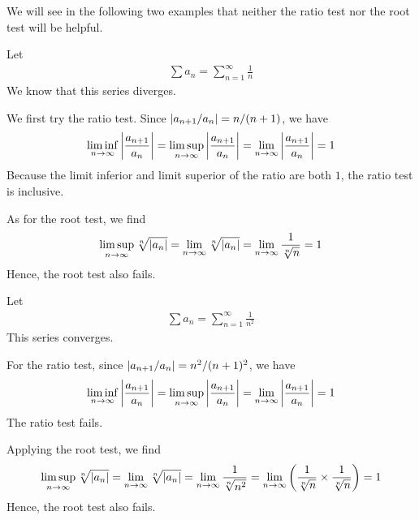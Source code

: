 \documentclass[thmcnt=section, 12pt]{my-elegantbook}
\begin{document}

We will see in the following two examples that neither the ratio test nor the root test will be helpful.

\begin{example}
    Let
    \begin{align*}
        \sum a_n = \sum_{n=1}^\infty \frac{1}{n}
    \end{align*}
    We know that this series diverges.

    We first try the ratio test. Since $\left\lvert  a_{n+1} / a_n  \right\rvert = n / (n+1)$, we have
    \begin{align*}
        \liminf_{n \to \infty} \left\lvert \frac{a_{n+1}}{a_n} \right\rvert
        = \limsup_{n \to \infty} \left\lvert \frac{a_{n+1}}{a_n} \right\rvert
        = \lim_{n \to \infty} \left\lvert \frac{a_{n+1}}{a_n} \right\rvert
        = 1
    \end{align*}
    Because the limit inferior and limit superior of the ratio are both $1$, the ratio test is inclusive.

    As for the root test, we find
    \begin{align*}
        \limsup_{n \to \infty} \sqrt[n]{\left\lvert a_n \right\rvert}
        = \lim_{n \to \infty} \sqrt[n]{\left\lvert a_n \right\rvert}
        = \lim_{n \to \infty} \frac{1}{\sqrt[n]{n}}
        = 1
    \end{align*}
    Hence, the root test also fails.
    \label{eg:7}
\end{example}

\begin{example}
    Let
    \begin{align*}
        \sum a_n = \sum_{n=1}^\infty \frac{1}{n^2}
    \end{align*}
    This series converges.

    For the ratio test, since $\left\lvert  a_{n+1} / a_n  \right\rvert = n^2 / (n+1)^2$, we have
    \begin{align*}
        \liminf_{n \to \infty} \left\lvert \frac{a_{n+1}}{a_n} \right\rvert
        = \limsup_{n \to \infty} \left\lvert \frac{a_{n+1}}{a_n} \right\rvert
        = \lim_{n \to \infty} \left\lvert \frac{a_{n+1}}{a_n} \right\rvert
        = 1
    \end{align*}
    The ratio test fails.

    Applying the root test, we find
    \begin{align*}
        \limsup_{n \to \infty} \sqrt[n]{\left\lvert a_n \right\rvert}
        = \lim_{n \to \infty} \sqrt[n]{\left\lvert a_n \right\rvert}
        = \lim_{n \to \infty} \frac{1}{\sqrt[n]{n^2}}
        = \lim_{n \to \infty} \left( \frac{1}{\sqrt[n]{n}} \times \frac{1}{\sqrt[n]{n}} \right)
        = 1
    \end{align*}
    Hence, the root test also fails.
    \label{eg:8}
\end{example}
\end{document}
